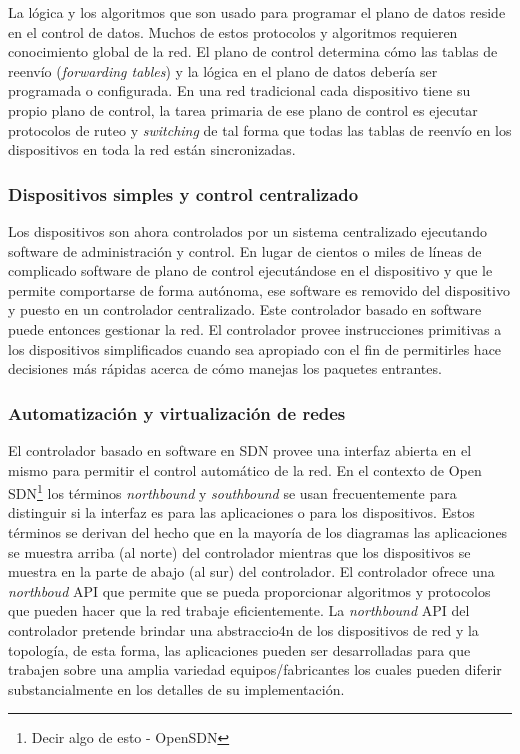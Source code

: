 \documentclass[10pt,journal,compsoc]{IEEEtran}
\begin{document}
La lógica y los algoritmos que son usado para programar el plano de datos reside en el control de datos. Muchos de estos protocolos y algoritmos requieren conocimiento global de la red. El plano de control determina cómo las tablas de reenvío (\emph{forwarding tables}) y la lógica en el plano de datos debería ser programada o configurada. En una red tradicional cada dispositivo tiene su propio plano de control, la tarea primaria de ese plano de control es ejecutar protocolos de ruteo y \emph{switching} de tal forma que todas las tablas de reenvío en los dispositivos en toda la red están sincronizadas.

\subsubsection{Dispositivos simples y control centralizado}
Los dispositivos son ahora controlados por un sistema centralizado ejecutando software de administración y control. En lugar de cientos o miles de líneas de complicado software de plano de control ejecutándose en el dispositivo y que le permite comportarse de forma autónoma, ese software es removido del dispositivo y puesto en un controlador centralizado. Este controlador basado en software puede entonces gestionar la red. El controlador provee instrucciones primitivas a los dispositivos simplificados cuando sea apropiado con el fin de permitirles hace decisiones más rápidas acerca de cómo manejas los paquetes entrantes.

\subsubsection{Automatización y virtualización de redes}
El controlador basado en software en SDN provee una interfaz abierta en el mismo para permitir el control automático de la red. En el contexto de Open SDN\footnote{Decir algo de esto - OpenSDN} los términos \emph{northbound} y \emph{southbound} se usan frecuentemente para distinguir si la interfaz es para las aplicaciones o para los dispositivos. Estos términos se derivan del hecho que en la mayoría de los diagramas las aplicaciones se muestra arriba (al norte) del controlador mientras que los dispositivos se muestra en la parte de abajo (al sur) del controlador. El controlador ofrece una \emph{northboud} API que permite que se pueda proporcionar algoritmos y protocolos que pueden hacer que la red trabaje eficientemente. La \emph{northbound} API del controlador pretende brindar una abstraccio4n de los dispositivos de red y la topología, de esta forma, las aplicaciones pueden ser desarrolladas para que trabajen sobre una amplia variedad equipos/fabricantes los cuales pueden diferir substancialmente en los detalles de su implementación.
\end{document}
